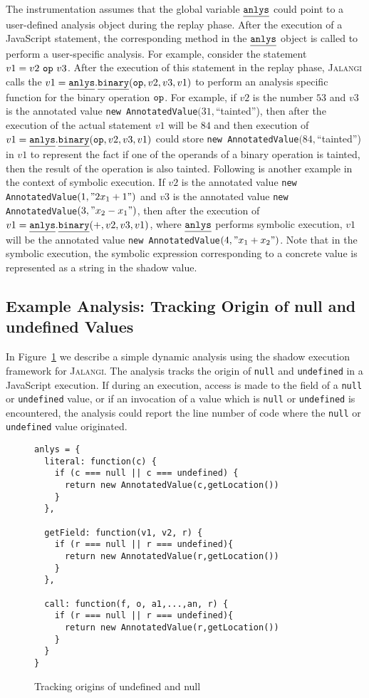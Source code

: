 \documentclass{sig-alternate}
\def\jalangi{\textsc{Jalangi}}
\newcommand \dsl [1] {\ensuremath{{\tt #1}}\xspace}
\newcommand \usl [1] {\mbox{\underline{\tt #1}}\xspace}
\newcommand \analysis{\usl{anlys}}
\begin{document}
The instrumentation assumes that the global variable $\analysis$ could
point to a user-defined analysis object during the replay phase.
After the execution of a JavaScript statement, the corresponding
method in the $\analysis$ object is called to perform a user-specific
analysis.  For example, consider the statement $v1 = v2\ \dsl{op}\
v3$.  After the execution of this statement in the replay phase,
\jalangi{} calls the $v1 = \analysis.\usl{binary}(\dsl{op}, v2, v3,
v1)$ to perform an analysis specific function for the binary operation
$\dsl{op}$.  For example, if $v2$ is the number $53$ and $v3$ is the
annotated value \texttt{new AnnotatedValue}$(31,$``tainted''), then
after the execution of the actual statement $v1$ will be $84$ and then
execution of $v1 = \analysis.\usl{binary}(\dsl{op}, v2, v3, v1)$ could
store \texttt{new AnnotatedValue}$(84,$``tainted'') in $v1$ to
represent the fact if one of the operands of a binary operation is
tainted, then the result of the operation is also tainted.  Following
is another example in the context of symbolic execution.  If $v2$ is
the annotated value \texttt{new AnnotatedValue}$(1, "2x_1+1")$ and
$v3$ is the annotated value \texttt{new AnnotatedValue}$(3,
"x_2-x_1")$, then after the execution of $v1 =
\analysis.\usl{binary}(+, v2, v3, v1)$, where $\analysis$ performs
symbolic execution, $v1$ will be the annotated value \texttt{new
  AnnotatedValue}$(4, "x_1+x_2")$.  Note that in the symbolic
execution, the symbolic expression corresponding to a concrete value
is represented as a string in the shadow value.

\subsection{Example Analysis: Tracking Origin of null and undefined Values}
\label{sec:example-analysis}

In Figure~\ref{fig:lib3} we describe a simple dynamic analysis using
the shadow execution framework for \jalangi{}.  The analysis tracks
the origin of \texttt{null} and \texttt{undefined} in a JavaScript
execution.  If during an execution, access is made to the field of a
\texttt{null} or \texttt{undefined} value, or if an invocation of a
value which is \texttt{null} or \texttt{undefined} is encountered, the
analysis could report the line number of code where the \texttt{null}
or \texttt{undefined} value originated.

\begin{figure}
 {\scriptsize
\begin{lstlisting}
anlys = {
  literal: function(c) {
    if (c === null || c === undefined) {
      return new AnnotatedValue(c,getLocation())
    }
  },

  getField: function(v1, v2, r) {
    if (r === null || r === undefined){
      return new AnnotatedValue(r,getLocation())
    }
  },

  call: function(f, o, a1,...,an, r) {
    if (r === null || r === undefined){
      return new AnnotatedValue(r,getLocation())
    }
  }
}
\end{lstlisting}
}
  \caption{Tracking origins of undefined and null}
  \label{fig:lib3}
\end{figure}
\end{document}
